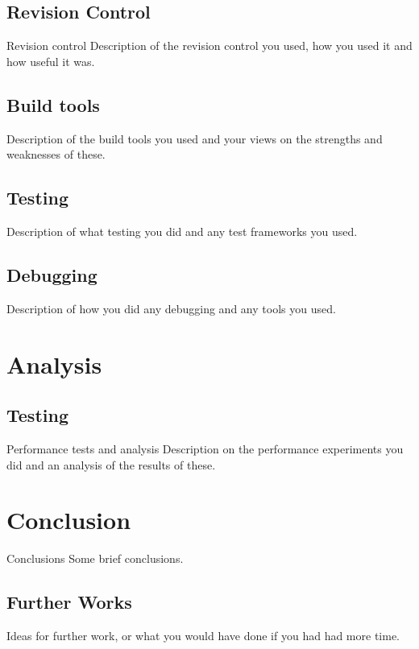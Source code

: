 \documentclass[a4paper,11pt]{article}
\begin{document}
\subsection{Revision Control}
Revision control Description of the revision control you used, how you used it and how useful it was.

\subsection{Build tools}
Description of the build tools you used and your views on the strengths and weaknesses of these.

\subsection{Testing}
Description of what testing you did and any test frameworks you used.

\subsection{Debugging}
 Description of how you did any debugging and any tools you used.
 
 \section{Analysis}
 
 \subsection{Testing}
Performance tests and analysis Description on the performance experiments you did and an analysis
of the results of these.
 
 \section{Conclusion}
Conclusions Some brief conclusions.
 
\subsection{Further Works}
 Ideas for further work, or what you would have done if you had had more time.
\end{document}
